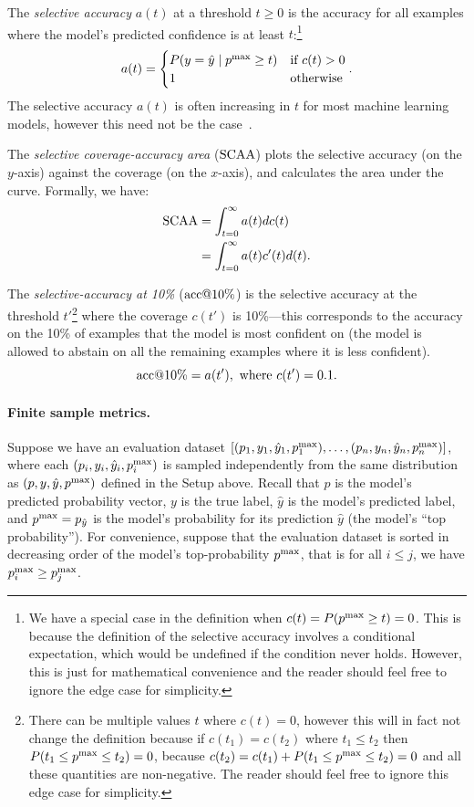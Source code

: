 The \emph{selective accuracy} $a(t)$ at a threshold $t \geq 0$ is the accuracy for all examples where the model's predicted confidence is at least $t$:\footnote{We have a special case in the definition when $c(t) = P(p^{\sf{\max}} \geq t) = 0$. This is because the definition of the selective accuracy involves a conditional expectation, which would be undefined if the condition never holds. However, this is just for mathematical convenience and the reader should feel free to ignore the edge case for simplicity.}
\begin{equation}
a(t) = \begin{cases}
  P(y = \hat{y} \mid p^{\sf{\max}} \geq t) & \mbox{if $c(t) > 0$} \\
  1 & \mbox{otherwise}
\end{cases}.
\end{equation}
The selective accuracy $a(t)$ is often increasing in $t$ for most machine learning models, however this need not be the case~\citep{jones2021selective}.

The \emph{selective coverage-accuracy area} ($\mbox{SCAA}$) plots the selective accuracy (on the $y$-axis) against the coverage (on the $x$-axis), and calculates the area under the curve. Formally, we have:
\begin{align}
\mbox{SCAA} &= \int_{t=0}^{\infty} a(t) dc(t) \\
&= \int_{t=0}^{\infty} a(t) c'(t) d(t).
\end{align}

The \emph{selective-accuracy at 10\%} ($\mbox{acc@10\%}$) is the selective accuracy at the threshold $t'$\footnote{There can be multiple values $t$ where $c(t) = 0$, however this will in fact not change the definition because if $c(t_1) = c(t_2)$ where $t_1 \leq t_2$ then $P(t_1 \leq p^{\sf{\max}} \leq t_2) = 0$, because $c(t_2) = c(t_1) + P(t_1 \leq p^{\sf{\max}} \leq t_2) = 0$ and all these quantities are non-negative. The reader should feel free to ignore this edge case for simplicity.} where the coverage $c(t')$ is 10\%---this corresponds to the accuracy on the 10\% of examples that the model is most confident on (the model is allowed to abstain on all the remaining examples where it is less confident).
\begin{equation}
\mbox{acc@10\%} = a(t'),\mbox{ where } c(t') = 0.1.
\end{equation}

\paragraph{Finite sample metrics.}
Suppose we have an evaluation dataset $[ (p_1, y_1, \hat{y}_1, p^{\sf{\max}}_1), \ldots, (p_n, y_n, \hat{y}_n, p^{\sf{\max}}_n) ]$, where each $(p_i, y_i, \hat{y}_i, p^{\sf{\max}}_i)$ is sampled independently from the same distribution as $(p, y, \hat{y}, p^{\sf{\max}})$ defined in the Setup above. Recall that $p$ is the model's predicted probability vector, $y$ is the true label, $\hat{y}$ is the model's predicted label, and $p^{\sf{\max}} = p_{\hat{y}}$ is the model's probability for its prediction $\hat{y}$ (the model's ``top probability''). For convenience, suppose that the evaluation dataset is sorted in decreasing order of the model's top-probability $p^{\sf{\max}}$, that is for all $i \leq j$, we have $p^{\sf{\max}}_i \geq p^{\sf{\max}}_j$. 

